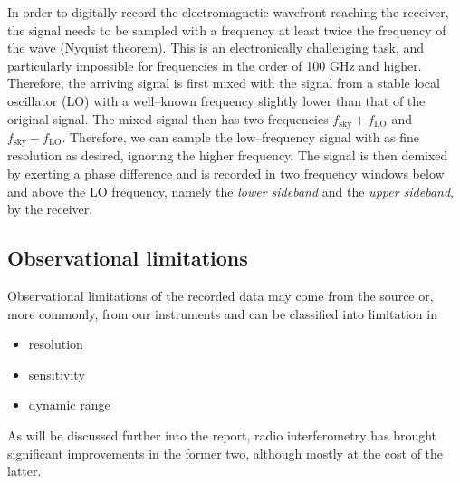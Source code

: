 \documentclass[paper=a4, fontsize=11pt]{scrartcl} %
\numberwithin{equation}{section} %
\numberwithin{figure}{section} %
\numberwithin{table}{section} %
\begin{document}
In order to digitally record the electromagnetic wavefront reaching the receiver, the signal needs to be sampled with a frequency at least twice the frequency of the wave (Nyquist theorem). This is an electronically challenging task, and particularly impossible for frequencies in the order of 100 GHz and higher. Therefore, the arriving signal is first mixed with the signal from a stable local oscillator (LO) with a well--known frequency slightly lower than that of the original signal. The mixed signal then has two frequencies $f_\mathrm{sky} + f_\mathrm{LO}$ and $f_\mathrm{sky} - f_\mathrm{LO}$. Therefore, we can sample the low--frequency signal with as fine resolution as desired, ignoring the higher frequency. The signal is then demixed by exerting a phase difference and is recorded in two frequency windows below and above the LO frequency, namely the \emph{lower sideband} and the \emph{upper sideband}, by the receiver.

\subsection{Observational limitations}
Observational limitations of the recorded data may come from the source or, more commonly, from our instruments and can be classified into limitation in 
\begin{itemize}
\item resolution
\item sensitivity
\item dynamic range
\end{itemize}
As will be discussed further into the report, radio interferometry has brought significant improvements in the former two, although mostly at the cost of the latter.
\end{document}
